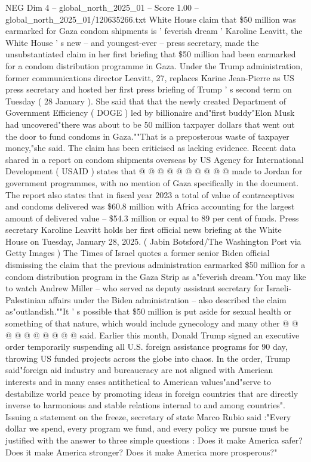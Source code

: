 \begin{textsample}{NEG Dim 4 – global\_north\_2025\_01 – Score 1.00 – global\_north\_2025\_01/120635266.txt}  \label{ex:f4_neg_419}
White House claim that \$50 million was earmarked for Gaza condom shipments is ' feverish dream ' Karoline Leavitt, the White House ' s new -- and youngest-ever -- press secretary, made the unsubstantiated claim in her first briefing that \$50 million had been earmarked for a condom distribution programme in Gaza.
Under the Trump administration, former communications director Leavitt, 27, replaces Karine Jean-Pierre as US press secretary and hosted her first press briefing of Trump ' s second term on Tuesday ( 28 January ).
She said that that the newly created Department of Government Efficiency ( DOGE ) led by billionaire and"first buddy"Elon Musk had uncovered"there was about to be 50 million taxpayer dollars that went out the door to fund condoms in Gaza.""That is a preposterous waste of taxpayer money,"she said.
The claim has been criticised as lacking evidence.
Recent data shared in a report on condom shipments overseas by US Agency for International Development ( USAID ) states that @ @ @ @ @ @ @ @ @ @ made to Jordan for government programmes, with no mention of Gaza specifically in the document.
The report also states that in fiscal year 2023 a total of value of contraceptives and condoms delivered was \$60.8 million with Africa accounting for the largest amount of delivered value -- \$54.3 million or equal to 89 per cent of funds.
Press secretary Karoline Leavitt holds her first official news briefing at the White House on Tuesday, January 28, 2025. ( Jabin Botsford/The Washington Post via Getty Images ) The Times of Israel quotes a former senior Biden official dismissing the claim that the previous administration earmarked \$50 million for a condom distribution program in the Gaza Strip as a"feverish dream."You may like to watch Andrew Miller -- who served as deputy assistant secretary for Israeli-Palestinian affairs under the Biden administration -- also described the claim as"outlandish.""It ' s possible that \$50 million is put aside for sexual health or something of that nature, which would include gynecology and many other @ @ @ @ @ @ @ @ @ @ said.
Earlier this month, Donald Trump signed an executive order temporarily suspending all U.S. foreign assistance programs for 90 day, throwing US funded projects across the globe into chaos.
In the order, Trump said"foreign aid industry and bureaucracy are not aligned with American interests and in many cases antithetical to American values"and"serve to destabilize world peace by promoting ideas in foreign countries that are directly inverse to harmonious and stable relations internal to and among countries".
Issuing a statement on the freeze, secretary of state Marco Rubio said :"Every dollar we spend, every program we fund, and every policy we pursue must be justified with the answer to three simple questions : Does it make America safer?
Does it make America stronger?
Does it make America more prosperous?"

\end{textsample}
